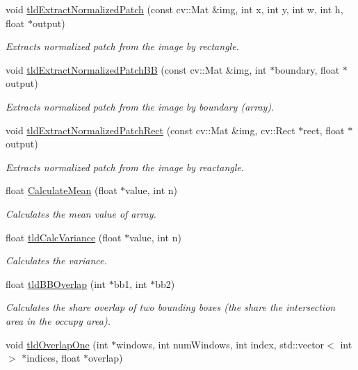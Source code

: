 \begin{DoxyCompactItemize}
void \hyperlink{namespacetld_ac965be65b1eae7ec666c3bfbe9da065e}{tld\-Extract\-Normalized\-Patch} (const cv\-::\-Mat \&img, int x, int y, int w, int h, float $\ast$output)
\begin{DoxyCompactList}\small\item\em Extracts normalized patch from the image by rectangle. \end{DoxyCompactList}\item 
void \hyperlink{namespacetld_a44b5f4d4d087d3369129bdc92e2a555a}{tld\-Extract\-Normalized\-Patch\-B\-B} (const cv\-::\-Mat \&img, int $\ast$boundary, float $\ast$output)
\begin{DoxyCompactList}\small\item\em Extracts normalized patch from the image by boundary (array). \end{DoxyCompactList}\item 
void \hyperlink{namespacetld_aa6c803037b38609e1fceadbb2ad8a75c}{tld\-Extract\-Normalized\-Patch\-Rect} (const cv\-::\-Mat \&img, cv\-::\-Rect $\ast$rect, float $\ast$output)
\begin{DoxyCompactList}\small\item\em Extracts normalized patch from the image by reactangle. \end{DoxyCompactList}\item 
float \hyperlink{namespacetld_a34eeb46b85efa569359847443ee96eba}{Calculate\-Mean} (float $\ast$value, int n)
\begin{DoxyCompactList}\small\item\em Calculates the mean value of array. \end{DoxyCompactList}\item 
float \hyperlink{namespacetld_a53d4a014fd3df2b3e8a3026a1c1768a7}{tld\-Calc\-Variance} (float $\ast$value, int n)
\begin{DoxyCompactList}\small\item\em Calculates the variance. \end{DoxyCompactList}\item 
float \hyperlink{namespacetld_a19776566a098d3b1fb15030e945a8c14}{tld\-B\-B\-Overlap} (int $\ast$bb1, int $\ast$bb2)
\begin{DoxyCompactList}\small\item\em Calculates the share overlap of two bounding boxes (the share the intersection area in the occupy area). \end{DoxyCompactList}\item 
void \hyperlink{namespacetld_a018caa7bf4a554814fe61a679a219489}{tld\-Overlap\-One} (int $\ast$windows, int num\-Windows, int index, std\-::vector$<$ int $>$ $\ast$indices, float $\ast$overlap)

\end{DoxyCompactItemize}
